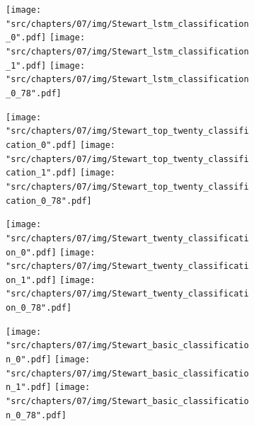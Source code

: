 \begin{figure}[!htbp]
    \begin{subfigure}{\textwidth}
        \texttt{[image: "src/chapters/07/img/Stewart\_lstm\_classification\_0".pdf]}
        \texttt{[image: "src/chapters/07/img/Stewart\_lstm\_classification\_1".pdf]}
        \texttt{[image: "src/chapters/07/img/Stewart\_lstm\_classification\_0\_78".pdf]}
    \end{subfigure}
    \begin{subfigure}{\textwidth}
        \texttt{[image: "src/chapters/07/img/Stewart\_top\_twenty\_classification\_0".pdf]}
        \texttt{[image: "src/chapters/07/img/Stewart\_top\_twenty\_classification\_1".pdf]}
        \texttt{[image: "src/chapters/07/img/Stewart\_top\_twenty\_classification\_0\_78".pdf]}
    \end{subfigure}
    \begin{subfigure}{\textwidth}
        \texttt{[image: "src/chapters/07/img/Stewart\_twenty\_classification\_0".pdf]}
        \texttt{[image: "src/chapters/07/img/Stewart\_twenty\_classification\_1".pdf]}
        \texttt{[image: "src/chapters/07/img/Stewart\_twenty\_classification\_0\_78".pdf]}
    \end{subfigure}
    \begin{subfigure}{\textwidth}
        \texttt{[image: "src/chapters/07/img/Stewart\_basic\_classification\_0".pdf]}
        \texttt{[image: "src/chapters/07/img/Stewart\_basic\_classification\_1".pdf]}
        \texttt{[image: "src/chapters/07/img/Stewart\_basic\_classification\_0\_78".pdf]}
    \end{subfigure}
\end{figure}

